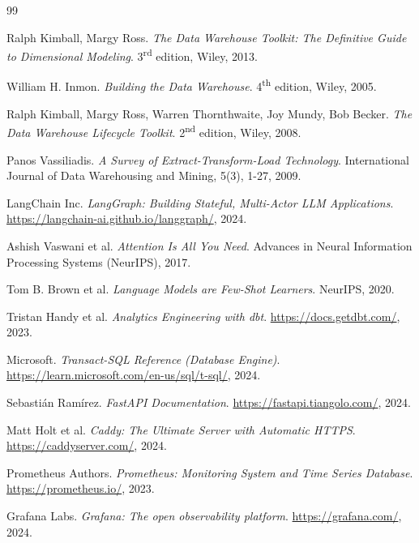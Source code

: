 \documentclass[12pt, a4paper]{report}
\begin{document}
\begin{thebibliography}{99}

Ralph Kimball, Margy Ross.
\textit{The Data Warehouse Toolkit: The Definitive Guide to
Dimensional Modeling}.
3\textsuperscript{rd} edition, Wiley, 2013.

William H. Inmon.
\textit{Building the Data Warehouse}.
4\textsuperscript{th} edition, Wiley, 2005.

Ralph Kimball, Margy Ross, Warren Thornthwaite, Joy Mundy, Bob Becker.
\textit{The Data Warehouse Lifecycle Toolkit}.
2\textsuperscript{nd} edition, Wiley, 2008.

Panos Vassiliadis.
\textit{A Survey of Extract-Transform-Load Technology}.
International Journal of Data Warehousing and Mining, 5(3), 1-27, 2009.

LangChain Inc.
\textit{LangGraph: Building Stateful, Multi-Actor LLM Applications}.
\url{https://langchain-ai.github.io/langgraph/}, 2024.

Ashish Vaswani et al.
\textit{Attention Is All You Need}.
Advances in Neural Information Processing Systems (NeurIPS), 2017.

Tom B. Brown et al.
\textit{Language Models are Few-Shot Learners}.
NeurIPS, 2020.

Tristan Handy et al.
\textit{Analytics Engineering with dbt}.
\url{https://docs.getdbt.com/}, 2023.

Microsoft.
\textit{Transact-SQL Reference (Database Engine)}.
\url{https://learn.microsoft.com/en-us/sql/t-sql/}, 2024.

Sebastián Ramírez.
\textit{FastAPI Documentation}.
\url{https://fastapi.tiangolo.com/}, 2024.

Matt Holt et al.
\textit{Caddy: The Ultimate Server with Automatic HTTPS}.
\url{https://caddyserver.com/}, 2024.

Prometheus Authors.
\textit{Prometheus: Monitoring System and Time Series Database}.
\url{https://prometheus.io/}, 2023.

Grafana Labs.
\textit{Grafana: The open observability platform}.
\url{https://grafana.com/}, 2024.


\end{thebibliography}
\end{document}
